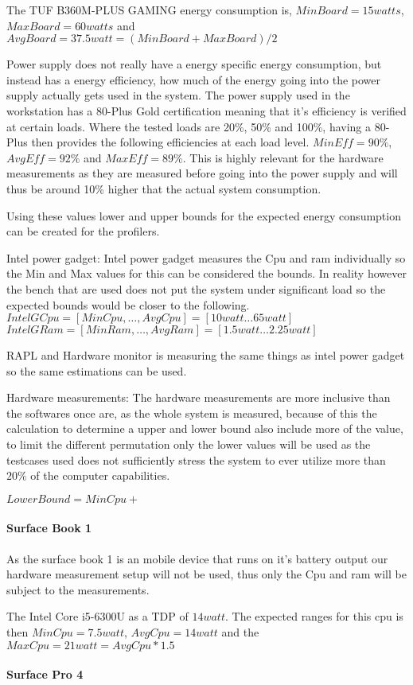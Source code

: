 The TUF B360M-PLUS GAMING energy consumption is, $MinBoard = 15 watts$, $MaxBoard = 60 watts$ and $AvgBoard = 37.5 watt= (MinBoard+MaxBoard)/2$

Power supply does not really have a energy specific energy consumption, but instead has a energy efficiency, how much of the energy going into the power supply actually gets used in the system. The power supply used in the workstation has a 80-Plus Gold certification meaning that it's efficiency is verified at certain loads. Where the tested loads are 20\%, 50\% and 100\%, having a 80-Plus then provides the following efficiencies at each load level. $MinEff=90\%$, $AvgEff=92\%$ and $MaxEff=89\%$. This is highly relevant for the hardware measurements as they are measured before going into the power supply and will thus be around 10\% higher that the actual system consumption.

Using these values lower and upper bounds for the expected energy consumption can be created for the profilers.

Intel power gadget:
Intel power gadget measures the Cpu and ram individually so the Min and Max values for this can be considered the bounds. In reality however the bench that are used does not put the system under significant load so the expected bounds would be closer to the following.
$IntelGCpu = [MinCpu, \dotsc ,AvgCpu] = [10 watt \dotsc 65 watt]$
$IntelGRam = [MinRam, \dotsc ,AvgRam] = [1.5 watt \dotsc 2.25 watt]$

RAPL and Hardware monitor is measuring the same things as intel power gadget so the same estimations can be used.

Hardware measurements:
The hardware measurements are more inclusive than the softwares once are, as the whole system is measured, because of this the calculation to determine a upper and lower bound also include more of the value, to limit the different permutation only the lower values will be used as the testcases used does not sufficiently stress the system to ever utilize more than $20\%$ of the computer capabilities.

$LowerBound = MinCpu + $

\paragraph{Surface Book 1}
As the surface book 1 is an mobile device that runs on it's battery output our hardware measurement setup will not be used, thus only the Cpu and ram will be subject to the measurements.

The Intel Core i5-6300U as a TDP of $14 watt$. The expected ranges for this cpu is then $MinCpu = 7.5 watt$, $AvgCpu = 14 watt$ and the $MaxCpu = 21 watt = AvgCpu*1.5$

\paragraph{Surface Pro 4}